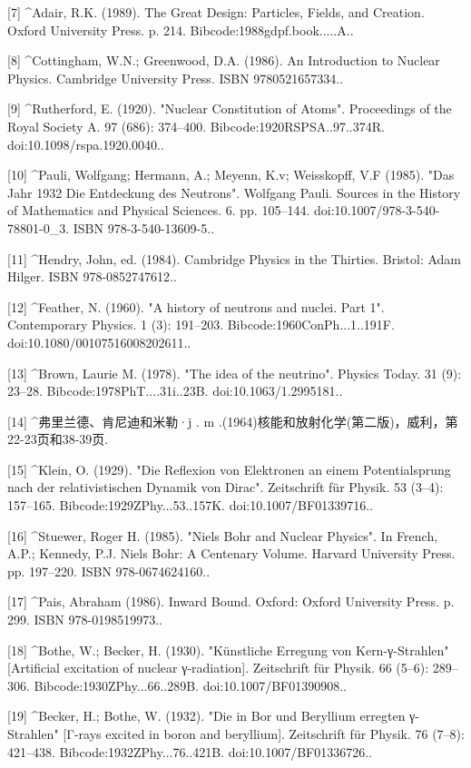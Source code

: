[7]
^Adair, R.K. (1989). The Great Design: Particles, Fields, and Creation. Oxford University Press. p. 214. Bibcode:1988gdpf.book.....A..

[8]
^Cottingham, W.N.; Greenwood, D.A. (1986). An Introduction to Nuclear Physics. Cambridge University Press. ISBN 9780521657334..

[9]
^Rutherford, E. (1920). "Nuclear Constitution of Atoms". Proceedings of the Royal Society A. 97 (686): 374–400. Bibcode:1920RSPSA..97..374R. doi:10.1098/rspa.1920.0040..

[10]
^Pauli, Wolfgang; Hermann, A.; Meyenn, K.v; Weisskopff, V.F (1985). "Das Jahr 1932 Die Entdeckung des Neutrons". Wolfgang Pauli. Sources in the History of Mathematics and Physical Sciences. 6. pp. 105–144. doi:10.1007/978-3-540-78801-0_3. ISBN 978-3-540-13609-5..

[11]
^Hendry, John, ed. (1984). Cambridge Physics in the Thirties. Bristol: Adam Hilger. ISBN 978-0852747612..

[12]
^Feather, N. (1960). "A history of neutrons and nuclei. Part 1". Contemporary Physics. 1 (3): 191–203. Bibcode:1960ConPh...1..191F. doi:10.1080/00107516008202611..

[13]
^Brown, Laurie M. (1978). "The idea of the neutrino". Physics Today. 31 (9): 23–28. Bibcode:1978PhT....31i..23B. doi:10.1063/1.2995181..

[14]
^弗里兰德、肯尼迪和米勒·j . m .(1964)核能和放射化学(第二版)，威利，第22-23页和38-39页.

[15]
^Klein, O. (1929). "Die Reflexion von Elektronen an einem Potentialsprung nach der relativistischen Dynamik von Dirac". Zeitschrift für Physik. 53 (3–4): 157–165. Bibcode:1929ZPhy...53..157K. doi:10.1007/BF01339716..

[16]
^Stuewer, Roger H. (1985). "Niels Bohr and Nuclear Physics". In French, A.P.; Kennedy, P.J. Niels Bohr: A Centenary Volume. Harvard University Press. pp. 197–220. ISBN 978-0674624160..

[17]
^Pais, Abraham (1986). Inward Bound. Oxford: Oxford University Press. p. 299. ISBN 978-0198519973..

[18]
^Bothe, W.; Becker, H. (1930). "Künstliche Erregung von Kern-γ-Strahlen" [Artificial excitation of nuclear γ-radiation]. Zeitschrift für Physik. 66 (5–6): 289–306. Bibcode:1930ZPhy...66..289B. doi:10.1007/BF01390908..

[19]
^Becker, H.; Bothe, W. (1932). "Die in Bor und Beryllium erregten γ-Strahlen" [Γ-rays excited in boron and beryllium]. Zeitschrift für Physik. 76 (7–8): 421–438. Bibcode:1932ZPhy...76..421B. doi:10.1007/BF01336726..

